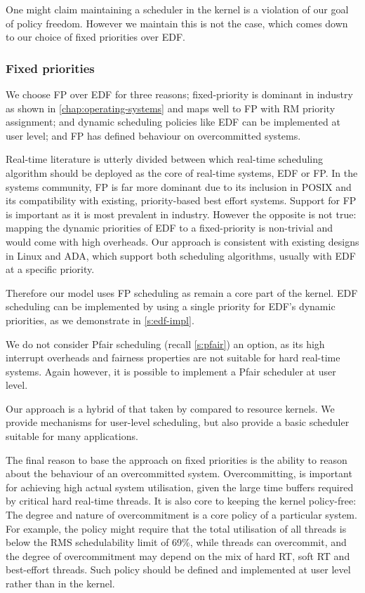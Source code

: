 One might claim maintaining a scheduler in the kernel is a violation of our goal of policy freedom.
However we maintain this is not the case, which comes down to our choice of fixed priorities over
\gls{EDF}.

\subsubsection{Fixed priorities}

We choose \gls{FP} over \gls{EDF} for three reasons; 
fixed-priority is dominant in industry
as shown in \cref{chap:operating-systems} and maps well to \gls{FP} with \gls{RM} priority assignment; and dynamic scheduling policies like
\gls{EDF} can be implemented at user level; and \gls{FP} has defined behaviour on overcommitted
systems.

Real-time literature is utterly divided between which real-time scheduling algorithm should be
deployed as the core of real-time systems, \gls{EDF} or \gls{FP}.  In the systems community,
\gls{FP} is far more dominant due to its inclusion in \gls{POSIX} and its compatibility with
existing, priority-based best effort systems.  Support for \gls{FP} is important as it is most
prevalent in industry.  
However the opposite is not true: mapping the dynamic priorities of EDF to a fixed-priority
is non-trivial and would come with high overheads. 
Our approach is consistent with existing designs in Linux  and ADA\citep{Burns_Wellings:crtpa}, which
support both scheduling algorithms, usually with \gls{EDF} at a specific priority.

Therefore our model uses \gls{FP} scheduling as remain a core part of the kernel.  \gls{EDF}
scheduling can be implemented by using a single priority for EDF's dynamic priorities, as we
demonstrate in \cref{s:edf-impl}.

We do not consider Pfair scheduling (recall \cref{s:pfair}) an option, as its high interrupt
overheads and fairness properties are not suitable for hard real-time systems.  Again however, it is
possible to implement a Pfair scheduler at user level.

Our approach is a hybrid of that taken by \composite compared to resource kernels. We provide
mechanisms for user-level scheduling, but also provide a basic scheduler suitable for many
applications. 

The final reason to base the approach on fixed priorities is the ability
to reason about the behaviour of an
overcommitted system. Overcommitting, is important for achieving high
actual system utilisation, given the large time buffers required by
critical hard real-time threads. It is also core to keeping the kernel
policy-free: The degree and nature of overcommitment is a core policy
of a particular system. For example, the policy might require that the
total utilisation of all  threads is below the RMS
schedulability limit of 69\%, while  threads can overcommit,
and the degree of overcommitment may depend on the mix of hard RT,
soft RT and best-effort threads. Such policy should be defined and
implemented at user level rather than in the kernel.

